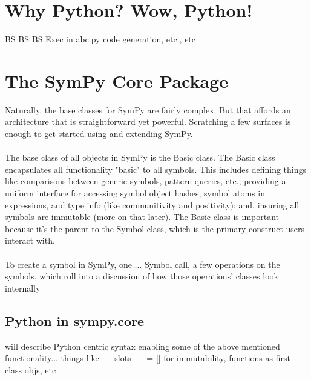 \documentclass[11pt,a4paper,oneside]{report}
\begin{document}
 \section*{Why Python? Wow, Python!}
 BS BS BS
 Exec in abc.py code generation, etc., etc
 \section*{The SymPy Core Package}
Naturally, the base classes for SymPy are fairly complex. But that affords an architecture that is straightforward yet powerful. Scratching a few surfaces is enough to get started using and extending SymPy.\\\\
The base class of all objects in SymPy is the Basic class. The Basic class encapsulates all functionality "basic" to all symbols. This includes defining things like comparisons between generic symbols, pattern queries, etc.; providing a uniform interface for accessing symbol object hashes, symbol atoms in expressions, and type info (like communitivity and positivity); and, insuring all symbols are immutable (more on that later). The Basic class is important because it's the parent to the Symbol class, which is the primary construct users interact with.\\\\
To create a symbol in SymPy, one 
...  \textasteriskcentered Symbol call, a few operations on the symbols, which roll into a discussion of how those operations' classes look internally \textasteriskcentered
\subsection*{\small Python in sympy.core}
\textasteriskcentered will describe Python centric syntax enabling some of the above mentioned functionality... things like \_\_slots\_\_ = [] for immutability, functions as first class objs, etc\textasteriskcentered
\end{document}
